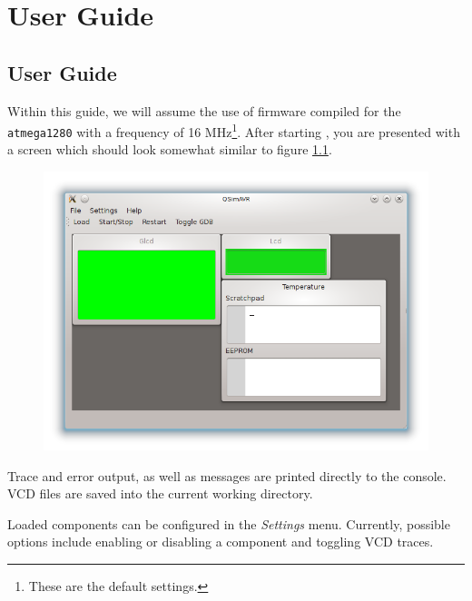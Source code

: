 
\chapter{User Guide} \label{chapter:user_guide}


\section{\qsimavr User Guide}

Within this guide, we will assume the use of firmware compiled for the
\verb|atmega1280| with a frequency of 16 \ac{MHz}\footnote{
%
These are the default settings.
%
}. After starting \qsimavr, you are presented with a screen which should look
somewhat similar to figure \ref{fig:qsimavr}.

\begin{figure}[ht]
\includegraphics[width=\textwidth]{images/qsimavr}
\caption{\qsimavr}
\label{fig:qsimavr}
\end{figure}

Trace and error output, as well as \simavr messages are printed directly to the
console. \ac{VCD} files are saved into the current working directory.

Loaded components can be configured in the \emph{Settings} menu. Currently,
possible options include enabling or disabling a component and toggling \ac{VCD}
traces.

